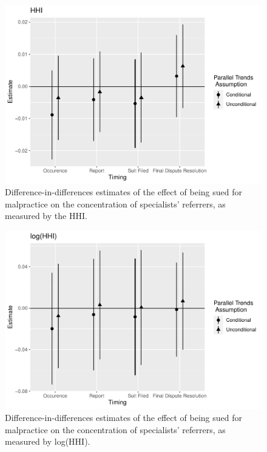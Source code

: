 \documentclass[
  12pt,
]{article}
\begin{document}
\begin{figure}
\centering
\includegraphics{Paper_files/figure-latex/hhiatt-1.pdf}
\caption{\label{fig:hhiatt}Difference-in-differences estimates of the effect of being sued for malpractice on the concentration of specialists' referrers, as measured by the HHI.}
\end{figure}

\begin{figure}
\centering
\includegraphics{Paper_files/figure-latex/lhhiatt-1.pdf}
\caption{\label{fig:lhhiatt}Difference-in-differences estimates of the effect of being sued for malpractice on the concentration of specialists' referrers, as measured by log(HHI).}
\end{figure}
\end{document}

